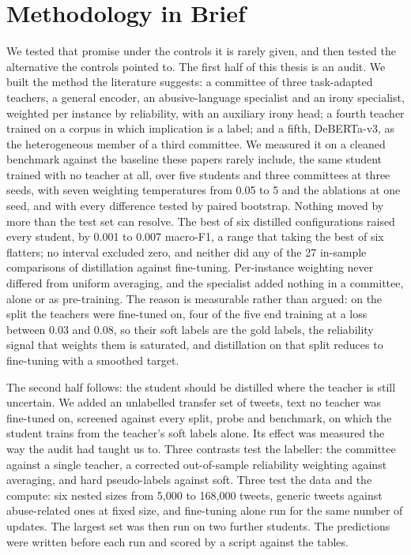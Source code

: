 \section{Methodology in Brief}
\label{sec:1.5}
We tested that promise under the controls it is rarely given, and then tested the alternative the
controls pointed to. The first half of this thesis is an audit. We built the method the literature
suggests: a committee of three task-adapted teachers, a general encoder, an abusive-language
specialist and an irony specialist, weighted per instance by reliability, with an auxiliary irony
head; a fourth teacher trained on a corpus in which implication is a label; and a fifth, DeBERTa-v3,
as the heterogeneous member of a third committee. We measured it on a cleaned benchmark against the
baseline these papers rarely include, the same student trained with no teacher at all, over five
students and three committees at three seeds, with seven weighting temperatures from 0.05 to 5 and
the ablations at one seed, and with every difference tested by paired bootstrap. Nothing moved by
more than the test set can resolve. The best of six distilled configurations raised every student,
by 0.001 to 0.007 macro-F1, a range that taking the best of six flatters; no interval excluded zero,
and neither did any of the 27 in-sample comparisons of distillation against fine-tuning.
Per-instance weighting never differed from uniform averaging, and the specialist added nothing in a
committee, alone or as pre-training. The reason is measurable rather than argued: on the split the
teachers were fine-tuned on, four of the five end training at a loss between 0.03 and 0.08, so their
soft labels are the gold labels, the reliability signal that weights them is saturated, and
distillation on that split reduces to fine-tuning with a smoothed target.

The second half follows: the student should be distilled where the teacher is still uncertain. We
added an unlabelled transfer set of tweets, text no teacher was fine-tuned on, screened against
every split, probe and benchmark, on which the student trains from the teacher's soft labels alone.
Its effect was measured the way the audit had taught us to. Three contrasts test the labeller: the
committee against a single teacher, a corrected out-of-sample reliability weighting against
averaging, and hard pseudo-labels against soft. Three test the data and the compute: six nested
sizes from 5,000 to 168,000 tweets, generic tweets against abuse-related ones at fixed size, and
fine-tuning alone run for the same number of updates. The largest set was then run on two further
students. The predictions were written before each run and scored by a script against the tables.

